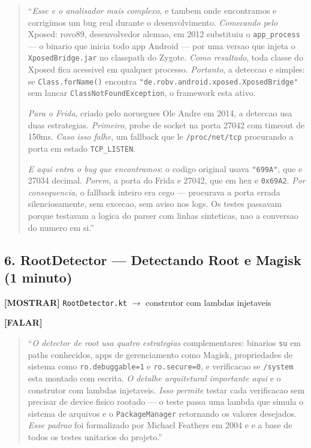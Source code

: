 \documentclass[12pt,a4paper]{article}
\begin{document}
\begin{quote}
``\textit{Esse e o analisador mais complexo}, e tambem onde encontramos
e corrigimos um bug real durante o desenvolvimento.
\textit{Comecando pelo} Xposed: rovo89, desenvolvedor alemao, em 2012
substituiu o \texttt{app\_process} --- o binario que inicia todo app Android ---
por uma versao que injeta o \texttt{XposedBridge.jar} no classpath do Zygote.
\textit{Como resultado}, toda classe do Xposed fica acessivel em qualquer processo.
\textit{Portanto}, a deteccao e simples: se \texttt{Class.forName()} encontra
\texttt{"de.robv.android.xposed.XposedBridge"} sem lancar
\texttt{ClassNotFoundException}, o framework esta ativo.

\textit{Para o Frida}, criado pelo noruegues Ole Andre em 2014,
a deteccao usa duas estrategias.
\textit{Primeiro}, probe de socket na porta 27042 com timeout de 150ms.
\textit{Caso isso falhe}, um fallback que le \texttt{/proc/net/tcp}
procurando a porta em estado \texttt{TCP\_LISTEN}.

\textit{E aqui entra o bug que encontramos}:
o codigo original usava \texttt{"699A"}, que e 27034 decimal.
\textit{Porem}, a porta do Frida e 27042, que em hex e \texttt{0x69A2}.
\textit{Por consequencia}, o fallback inteiro era cego --- procurava
a porta errada silenciosamente, sem excecao, sem aviso nos logs.
Os testes passavam porque testavam a logica do parser
com linhas sinteticas, nao a conversao do numero em si.''
\end{quote}

\vspace{0.3cm}

\subsection*{6. RootDetector --- Detectando Root e Magisk (1 minuto)}

\textbf{[MOSTRAR]} \texttt{RootDetector.kt} $\to$ construtor com lambdas injetaveis

\textbf{[FALAR]}

\begin{quote}
``\textit{O detector de root usa quatro estrategias} complementares:
binarios \texttt{su} em paths conhecidos, apps de gerenciamento como Magisk,
propriedades de sistema como \texttt{ro.debuggable=1} e \texttt{ro.secure=0},
e verificacao se \texttt{/system} esta montado com escrita.
\textit{O detalhe arquitetural importante aqui} e o construtor com lambdas injetaveis.
\textit{Isso permite} testar cada verificacao sem precisar de device fisico rootado ---
o teste passa uma lambda que simula o sistema de arquivos e o
\texttt{PackageManager} retornando os valores desejados.
\textit{Esse padrao} foi formalizado por Michael Feathers em 2004
e e a base de todos os testes unitarios do projeto.''
\end{quote}
\end{document}
